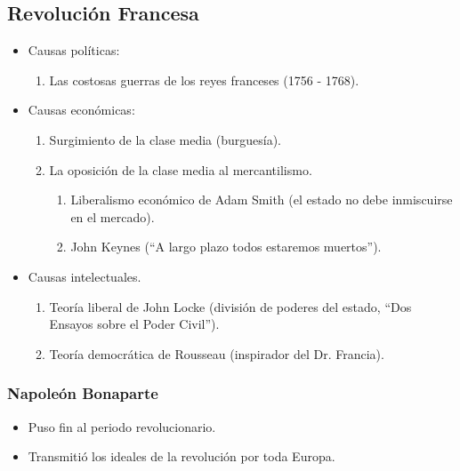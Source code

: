 \subsection{Revolución Francesa}

\begin{itemize}

\item Causas políticas:
\begin{enumerate}
	\item Las costosas guerras de los reyes franceses (1756 - 1768).
\end{enumerate}

\item Causas económicas:
\begin{enumerate}
	\item Surgimiento de la clase media (burguesía).
	\item La oposición de la clase media al mercantilismo.
	\begin{enumerate}
		\item Liberalismo económico de Adam Smith (el estado no debe inmiscuirse en el mercado).
		\item John Keynes (``A largo plazo todos estaremos muertos'').
	\end{enumerate}
\end{enumerate}

\item Causas intelectuales.
\begin{enumerate}
	\item Teoría liberal de John Locke (división de poderes del estado, ``Dos Ensayos sobre el Poder Civil'').
	\item Teoría democrática de Rousseau (inspirador del Dr. Francia).
\end{enumerate}

\end{itemize}

\subsubsection{Napoleón Bonaparte}

\begin{itemize}

\item Puso fin al periodo revolucionario.
\item Transmitió los ideales de la revolución por toda Europa.

\end{itemize}